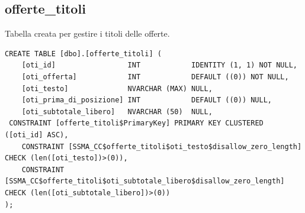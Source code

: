 \documentclass[12pt]{article}
\begin{document}
\subsection{offerte\_titoli}
Tabella creata per gestire i titoli delle offerte.
\begin{lstlisting}
CREATE TABLE [dbo].[offerte_titoli] (
    [oti_id]                 INT            IDENTITY (1, 1) NOT NULL,
    [oti_offerta]            INT            DEFAULT ((0)) NOT NULL,
    [oti_testo]              NVARCHAR (MAX) NULL,
    [oti_prima_di_posizione] INT            DEFAULT ((0)) NULL,
    [oti_subtotale_libero]   NVARCHAR (50)  NULL,
 CONSTRAINT [offerte_titoli$PrimaryKey] PRIMARY KEY CLUSTERED ([oti_id] ASC),
    CONSTRAINT [SSMA_CC$offerte_titoli$oti_testo$disallow_zero_length] CHECK (len([oti_testo])>(0)),
    CONSTRAINT [SSMA_CC$offerte_titoli$oti_subtotale_libero$disallow_zero_length] CHECK (len([oti_subtotale_libero])>(0))
);
\end{lstlisting}
\end{document}
